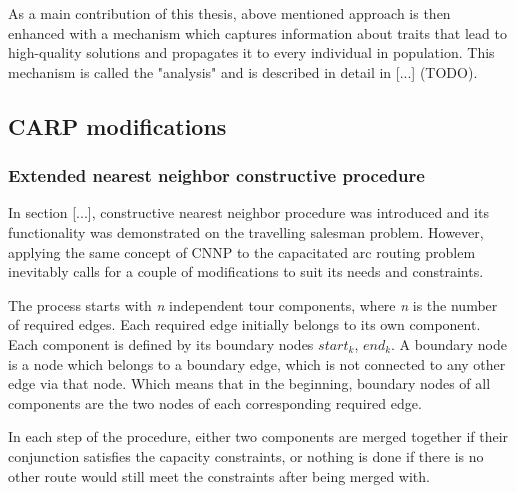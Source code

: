 \documentclass[twoside]{ctuthesis}
\theoremstyle{plain}
\theoremstyle{definition}
\theoremstyle{note}
\begin{document}
As a main contribution of this thesis, above mentioned approach is then enhanced with a mechanism which captures information about traits that lead to high-quality solutions and propagates it to every individual in population. This mechanism is called the "analysis" and is described in detail in [...] (TODO).



\subsection{CARP modifications}

\subsubsection{Extended nearest neighbor constructive procedure}
In section [...], constructive nearest neighbor procedure was introduced and its functionality was demonstrated on the travelling salesman problem. However, applying the same concept of CNNP to the capacitated arc routing problem inevitably calls for a couple of modifications to suit its needs and constraints.

The process starts with \emph{n} independent tour components, where \emph{n} is the number of required edges. Each required edge initially belongs to its own component. Each component is defined by its boundary nodes {\emph{$start_k$}, \emph{$end_k$}}. A boundary node is a node which belongs to a boundary edge, which is not connected to any other edge via that node. Which means that in the beginning, boundary nodes of all components are the two nodes of each corresponding required edge. 

In each step of the procedure, either two components are merged together if their conjunction satisfies the capacity constraints, or nothing is done if there is no other route would still meet the constraints after being merged with.
\end{document}
